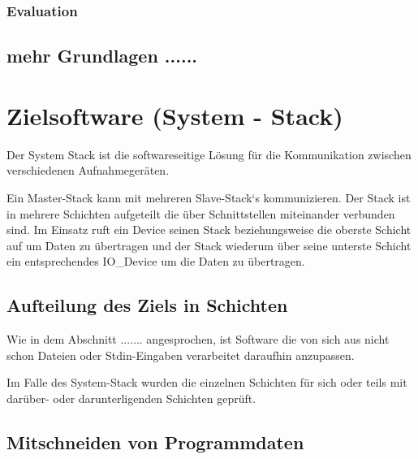 \documentclass[12pt,a4paper]{scrreprt}
\begin{document}
\subsection{Evaluation}

\section{mehr Grundlagen ......}


\newpage
\chapter{Zielsoftware (System - Stack)}
Der System Stack ist die softwareseitige Lösung für die Kommunikation zwischen verschiedenen Aufnahmegeräten.

Ein Master-Stack kann mit mehreren Slave-Stack`s kommunizieren. Der Stack ist in mehrere Schichten aufgeteilt die über Schnittstellen miteinander verbunden sind. Im Einsatz ruft ein Device seinen Stack beziehungsweise die oberste Schicht auf um Daten zu übertragen und der Stack wiederum über seine unterste Schicht ein entsprechendes IO\_Device um die Daten zu übertragen.


\section{Aufteilung des Ziels in Schichten}

Wie in dem Abschnitt ....... angesprochen, ist Software die von sich aus nicht schon Dateien oder Stdin-Eingaben verarbeitet daraufhin anzupassen.

Im Falle des System-Stack wurden die einzelnen Schichten für sich oder teils mit darüber- oder darunterligenden Schichten geprüft. 



\newpage
\section{Mitschneiden von Programmdaten}
\end{document}
